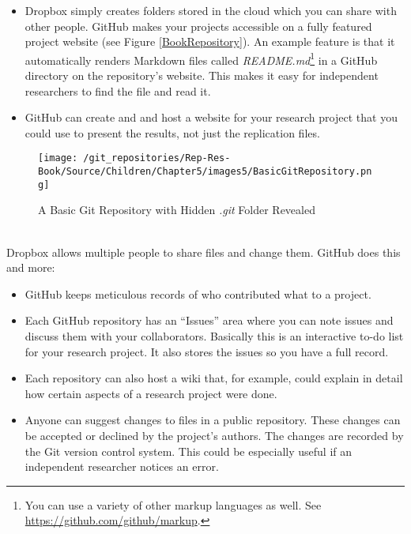 \begin{itemize}
    \item Dropbox simply creates folders stored in the cloud which you can share with other people. GitHub makes your projects accessible on a fully featured project website (see Figure \ref{BookRepository}). An example feature is that it automatically renders Markdown files called {\emph{README.md}}\footnote{You can use a variety of other markup languages as well. See \url{https://github.com/github/markup}.} in a GitHub directory on the repository's website. This makes it easy for independent researchers to find the file and read it.   
    \item GitHub can create and and host a website for your research project that you could use to present the results, not just the replication files.
\end{itemize} 

\vspace{0.25cm}

\begin{wrapfigure}{r}{0.5\textwidth}
    \caption{A Basic Git Repository with Hidden {\emph{.git}} Folder Revealed}
    \label{BasicGitRepo}
        \begin{center}    
        \texttt{[image: /git\_repositories/Rep-Res-Book/Source/Children/Chapter5/images5/BasicGitRepository.png]}
        \end{center}
\end{wrapfigure}
       
 \\[0.25cm]

Dropbox allows multiple people to share files and change them. GitHub does this and more:

\begin{itemize}
        \item GitHub keeps meticulous records of who contributed what to a project.
        \item Each GitHub repository has an ``Issues'' area where you can note issues and discuss them with your collaborators. Basically this is an interactive to-do list for your research project. It also stores the issues so you have a full record.
        \item Each repository can also host a wiki that, for example, could explain in detail how certain aspects of a research project were done.
        \item Anyone can suggest changes to files in a public repository. These changes can be accepted or declined by the project's authors. The changes are recorded by the Git version control system. This could be especially useful if an independent researcher notices an error. 
\end{itemize}

